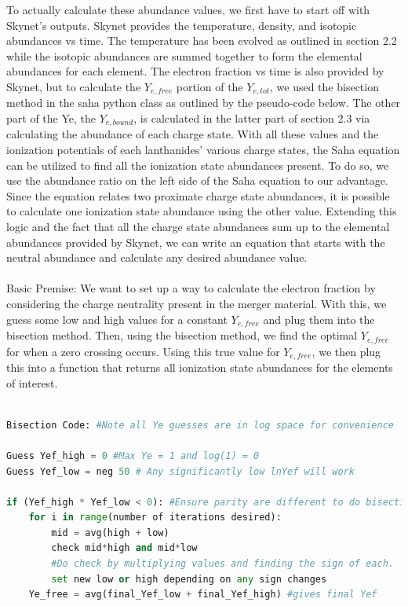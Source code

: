 \documentclass[11pt,a4paper]{article}
\begin{document}
To actually calculate these abundance values, we first have to start off with Skynet's outputs. Skynet provides the temperature, density, and isotopic abundances vs time. The temperature has been evolved as outlined in section 2.2 while the isotopic abundances are summed together to form the elemental abundances for each element. The electron fraction vs time is also provided by Skynet, but to calculate the $Y_{e,free}$ portion of the $Y_{e,tot}$, we used the bisection method in the saha python class as outlined by the pseudo-code below. The other part of the Ye, the $Y_{e,bound}$, is calculated in the latter part of section 2.3 via calculating the abundance of each charge state. With all these values and the ionization potentials of each lanthanides' various charge states, the Saha equation can be utilized to find all the ionization state abundances present. To do so, we use the abundance ratio on the left side of the Saha equation to our advantage. Since the equation relates two proximate charge state abundances, it is possible to calculate one ionization state abundance using the other value. Extending this logic and the fact that all the charge state abundances sum up to the elemental abundances provided by Skynet, we can write an equation that starts with the neutral abundance and calculate any desired abundance value. \\

\\
Basic Premise: We want to set up a way to calculate the electron fraction by considering the charge neutrality present in the merger material. With this, we guess some low and high values for a constant $Y_{e,free}$ and plug them into the bisection method. Then, using the bisection method, we find the optimal $Y_{e,free}$ for when a zero crossing occurs. Using this true value for $Y_{e,free}$, we then plug this into a function that returns all ionization
state abundances for the elements of interest. 

\begin{lstlisting}[language=Python]
			
Bisection Code: #Note all Ye guesses are in log space for convenience

Guess Yef_high = 0 #Max Ye = 1 and log(1) = 0
Guess Yef_low = neg 50 # Any significantly low lnYef will work

if (Yef_high * Yef_low < 0): #Ensure parity are different to do bisection
	for i in range(number of iterations desired):
		mid = avg(high + low)
		check mid*high and mid*low 
		#Do check by multiplying values and finding the sign of each.
		set new low or high depending on any sign changes		
	Ye_free = avg(final_Yef_low + final_Yef_high) #gives final Yef
	
\end{lstlisting}
\end{document}
